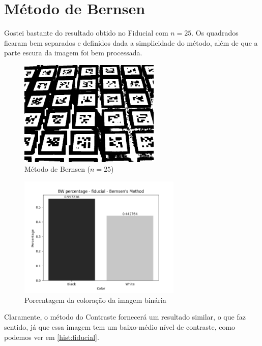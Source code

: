\documentclass[12pt, letterpaper]{article}
\begin{document}
\section{Método de Bernsen}
    Gostei bastante do resultado obtido no Fiducial com $n = 25$. Os quadrados ficaram bem separados e definidos dada a simplicidade do método, além de que a parte escura da imagem foi bem processada.
    \begin{figure}[H]
        \centering
        \includegraphics[width=0.6\textwidth]{bernsen_fiducial.png}
        \\{Método de Bernsen ($n = 25$)}

        \includegraphics[width=0.69\textwidth]{bernsen_fiducial_bw_percentage.png}
        \\{Porcentagem da coloração da imagem binária}
    \end{figure} 
    Claramente, o método do Contraste fornecerá um resultado similar, o que faz sentido, já que essa imagem tem um baixo-médio nível de contraste, como podemos ver em \ref{hist:fiducial}.
\end{document}

